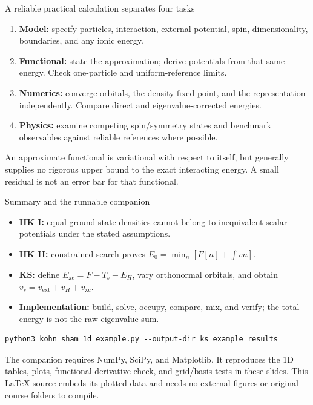 \documentclass[aspectratio=169,10pt]{beamer}
\newcommand{\warnbox}[1]{\begin{tcolorbox}[colback=palewarm,colframe=warm,title={A trap to avoid}]#1\end{tcolorbox}}
\newcommand{\ext}{\mathrm{ext}}
\newcommand{\xc}{\mathrm{xc}}
\begin{document}
\begin{frame}{A reliable practical calculation separates four tasks}
\begin{enumerate}
\item \textbf{Model:} specify particles, interaction, external potential,
spin, dimensionality, boundaries, and any ionic energy.
\item \textbf{Functional:} state the approximation; derive potentials from
that same energy. Check one-particle and uniform-reference limits.
\item \textbf{Numerics:} converge orbitals, the density fixed point, and the
representation independently. Compare direct and eigenvalue-corrected energies.
\item \textbf{Physics:} examine competing spin/symmetry states and benchmark
observables against reliable references where possible.
\end{enumerate}
\warnbox{An approximate functional is variational with respect to itself,
but generally supplies no rigorous upper bound to the exact interacting
energy. A small residual is not an error bar for that functional.}
\end{frame}

\begin{frame}[fragile]{Summary and the runnable companion}
\begin{itemize}
\item \textbf{HK I:} equal ground-state densities cannot belong to inequivalent
scalar potentials under the stated assumptions.
\item \textbf{HK II:} constrained search proves $E_0=\min_n[F[n]+\int vn]$.
\item \textbf{KS:} define $E_{\xc}=F-T_s-E_H$, vary orthonormal orbitals, and
obtain $v_s=v_{\ext}+v_H+v_{\xc}$.
\item \textbf{Implementation:} build, solve, occupy, compare, mix, and verify;
the total energy is not the raw eigenvalue sum.
\end{itemize}
\begin{lstlisting}
python3 kohn_sham_1d_example.py --output-dir ks_example_results
\end{lstlisting}
\small The companion requires NumPy, SciPy, and Matplotlib. It reproduces
the 1D tables, plots, functional-derivative check, and grid/basis tests in
these slides. This LaTeX source embeds its plotted data and needs no external
figures or original course folders to compile.
\end{frame}
\end{document}
